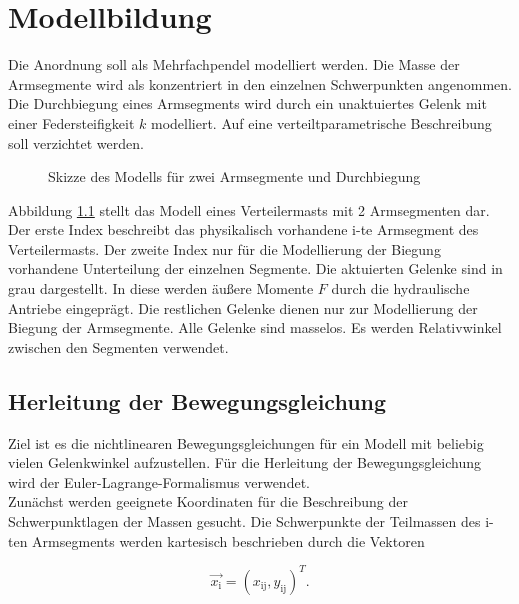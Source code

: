 \chapter{Modellbildung}
Die Anordnung soll als Mehrfachpendel modelliert werden. Die Masse der Armsegmente wird als konzentriert in den einzelnen Schwerpunkten angenommen. Die Durchbiegung eines Armsegments wird durch ein unaktuiertes Gelenk mit einer Federsteifigkeit $k$ modelliert. Auf eine verteiltparametrische Beschreibung soll verzichtet werden.

\begin{figure}[h!]
\centering
\def\svgscale{0.8}

\caption{Skizze des Modells für zwei Armsegmente und Durchbiegung}
\label{fig:Skizze}
\end{figure}


Abbildung \ref{fig:Skizze} stellt das Modell eines Verteilermasts mit 2 Armsegmenten dar. Der erste Index beschreibt das physikalisch vorhandene i-te Armsegment des Verteilermasts. Der zweite Index nur für die Modellierung der Biegung vorhandene Unterteilung der einzelnen Segmente. Die aktuierten Gelenke sind in grau dargestellt. In diese werden äußere Momente $F$ durch die hydraulische Antriebe eingeprägt. Die restlichen Gelenke dienen nur zur Modellierung der Biegung der Armsegmente. Alle Gelenke sind masselos. Es werden Relativwinkel zwischen den Segmenten verwendet.\\
\section{Herleitung der Bewegungsgleichung}
Ziel ist es die nichtlinearen Bewegungsgleichungen für ein Modell mit beliebig vielen Gelenkwinkel aufzustellen. Für die Herleitung der Bewegungsgleichung wird der Euler-Lagrange-Formalismus verwendet.\\ 
Zunächst werden geeignete Koordinaten für die Beschreibung der Schwerpunktlagen der Massen gesucht. Die Schwerpunkte der Teilmassen des i-ten Armsegments werden kartesisch beschrieben durch die Vektoren

\begin{equation}
\vec{x_\mathrm{i}}=(x_\mathrm{ij},y_\mathrm{ij})^T.
\end{equation}

